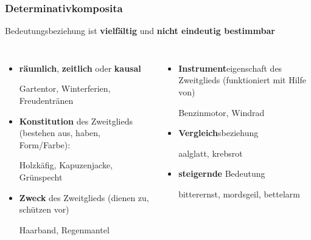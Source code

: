 \begin{frame}
\frametitle{Determinativkomposita}


Bedeutungsbeziehung ist \textbf{vielfältig} und \textbf{nicht eindeutig bestimmbar}

\begin{columns}
	

\begin{itemize}

	\item \textbf{räumlich},  \textbf{zeitlich} oder \textbf{kausal}
	
	\ea Gartentor, Winterferien, Freudentränen
	\z
	
	\item \textbf{Konstitution} des Zweitglieds (bestehen aus, haben, Form/Farbe):
	
	\ea Holzkäfig, Kapuzenjacke, Grünspecht
	\z

	\item \textbf{Zweck} des Zweitglieds (dienen zu, schützen vor)

	\ea Haarband, Regenmantel
	\z	
\end{itemize}

	
\begin{itemize}
	\item \textbf{Instrument}eigenschaft des Zweitglieds (funktioniert mit Hilfe von)
	
	\ea Benzinmotor, Windrad
	\z
	
	\item \textbf{Vergleich}sbeziehung
	
	\ea aalglatt, krebsrot
	\z
	
	\item \textbf{steigernde} Bedeutung
	
	\ea bitterernst, mordsgeil, bettelarm
	\z
\end{itemize}

\end{columns}
	
\end{frame}



